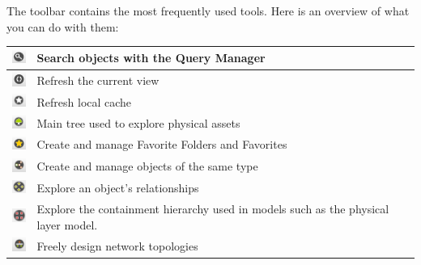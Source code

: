 \documentclass[a4paper]{article}
\begin{document}
	The toolbar contains the most frequently used tools. Here is an overview of what you can do with them:
	\begin{table}[h!]
		\centering
		\begin{tabular}{cl}
			\includegraphics[width=0.5cm]{img/icon_query_manager.png} & Search objects with the Query Manager\\
			\midrule
			\includegraphics[width=0.5cm]{img/icon_refresh_component.png} & Refresh the current view\\
			\midrule
			\includegraphics[width=0.5cm]{img/icon_refresh_cache.png} & Refresh local cache\\
			\midrule
			\includegraphics[width=0.5cm]{img/icon_navigation_tree.png} & Main tree used to explore physical assets\\
			\midrule
			\includegraphics[width=0.5cm]{img/icon_bookmarks.png} & Create and manage Favorite Folders and Favorites\\
			\midrule
			\includegraphics[width=0.5cm]{img/icon_pools_manager.png} & Create and manage objects of the same type\\
			\midrule
			\includegraphics[width=0.5cm]{img/icon_relationship_explorer.png} & Explore an object's relationships\\
			\midrule
			\includegraphics[width=0.5cm]{img/icon_special_children_explorer.png} & Explore the containment hierarchy used in models such as the physical layer model.\\
			\midrule
			\includegraphics[width=0.5cm]{img/icon_topology_designer.png} & Freely design network topologies\\

\end{tabular}
\end{table}
\end{document}
